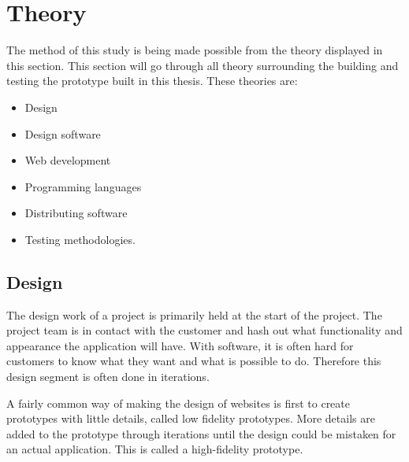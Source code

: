 \section{Theory}

The method of this study is being made possible from the theory displayed in this section. This section will go through all theory surrounding the building and testing the prototype built in this thesis. These theories are: 
\begin{itemize}
  \item Design
  \item Design software
  \item Web development
  \item Programming languages
  \item Distributing software
  \item Testing methodologies. 
\end{itemize}





\subsection{Design}%
\label{sub:Design}
The design work of a project is primarily held at the start of the project. The project team is in contact with the customer and hash out what functionality and appearance the application will have. With software, it is often hard for customers to know what they want and what is possible to do. Therefore this design segment is often done in iterations.

A fairly common way of making the design of websites is first to create prototypes with little details, called low fidelity prototypes. More details are added to the prototype through iterations until the design could be mistaken for an actual application. This is called a high-fidelity prototype.

